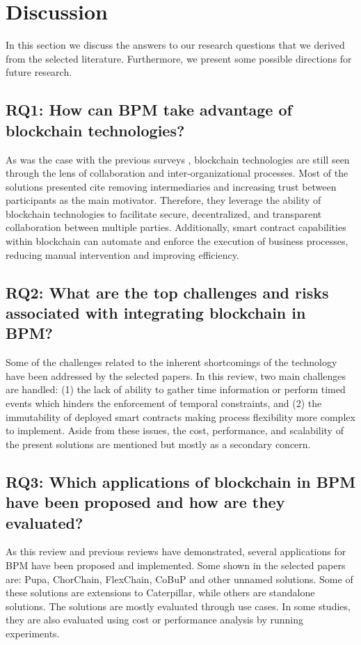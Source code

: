 \section{Discussion}
In this section we discuss the answers to our research questions that we derived from the selected literature. Furthermore, we present some possible directions for future research.

\subsection{RQ1: How can BPM take advantage of blockchain technologies?}
As was the case with the previous surveys \cite{mendling_blockchains_2018, garcia-garcia_using_2020, lauster}, blockchain technologies are still seen through the lens of collaboration and inter-organizational processes. Most of the solutions presented cite removing intermediaries and increasing trust between participants as the main motivator. Therefore, they leverage the ability of blockchain technologies to facilitate secure, decentralized, and transparent collaboration between multiple parties. Additionally, smart contract capabilities within blockchain can automate and enforce the execution of business processes, reducing manual intervention and improving efficiency. 

\subsection{RQ2: What are the top challenges and risks associated with integrating blockchain in BPM?}
Some of the challenges related to the inherent shortcomings of the technology have been addressed by the selected papers. In this review, two main challenges are handled: (1) the lack of ability to gather time information or perform timed events which hinders the enforcement of temporal constraints, and (2) the immutability of deployed smart contracts making process flexibility more complex to implement. Aside from these issues, the cost, performance, and scalability of the present solutions are mentioned but mostly as a secondary concern. 

\subsection{RQ3: Which applications of blockchain in BPM have been proposed and how are they evaluated?}
As this review and previous reviews have demonstrated, several applications for BPM have been proposed and implemented. Some shown in the selected papers are: Pupa, ChorChain, FlexChain, CoBuP and other unnamed solutions. Some of these solutions are extensions to Caterpillar, while others are standalone solutions. The solutions are mostly evaluated through use cases. In some studies, they are also evaluated using cost or performance analysis by running experiments. 

